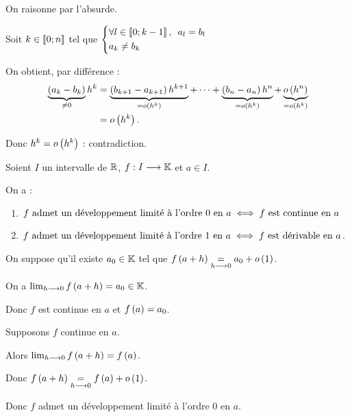 \begin{dem}
On raisonne par l'absurde.

Soit \(k\in\left\llbracket0;n\right\rrbracket\) tel que \(\begin{dcases}
\quantifs{\forall l\in\interventierii{0}{k-1}}a_l=b_l \\
a_k\not=b_k
\end{dcases}\)

On obtient, par différence : \[\begin{aligned}
\underbrace{\left(a_k-b_k\right)}_{\not=0}h^k&=\underbrace{\left(b_{k+1}-a_{k+1}\right)h^{k+1}}_{=o\left(h^k\right)}+\dots+\underbrace{\left(b_n-a_n\right)h^n}_{=o\left(h^k\right)}+\underbrace{o\left(h^n\right)}_{=o\left(h^k\right)} \\
&=o\left(h^k\right).
\end{aligned}\]

Donc \(h^k=o\left(h^k\right)\) : contradiction.
\end{dem}

\begin{prop}
Soient \(I\) un intervalle de \(\mathbb{R}\), \(f:I\longrightarrow\mathbb{K}\) et \(a\in I\).

On a :

\begin{enumerate}
    \item \(f\text{ admet un développement limité à l'ordre 0 en }a\iff f\text{ est continue en }a\) \\
    \item \(f\text{ admet un développement limité à l'ordre 1 en }a\iff f\text{ est dérivable en }a\).
\end{enumerate}
\end{prop}

\begin{dem}[1]
\impdir

On suppose qu'il existe \(a_0\in\mathbb{K}\) tel que \(f\left(a+h\right)\underset{h\longrightarrow0}{=}a_0+o\left(1\right)\).

On a \(\lim_{h\longrightarrow0}f\left(a+h\right)=a_0\in\mathbb{K}\).

Donc \(f\) est continue en \(a\) et \(f\left(a\right)=a_0\).

\imprec

Supposons \(f\) continue en \(a\).

Alors \(\lim_{h\longrightarrow0}f\left(a+h\right)=f\left(a\right)\).

Donc \(f\left(a+h\right)\underset{h\longrightarrow0}{=}f\left(a\right)+o\left(1\right)\).

Donc \(f\) admet un développement limité à l'ordre 0 en \(a\).
\end{dem}

